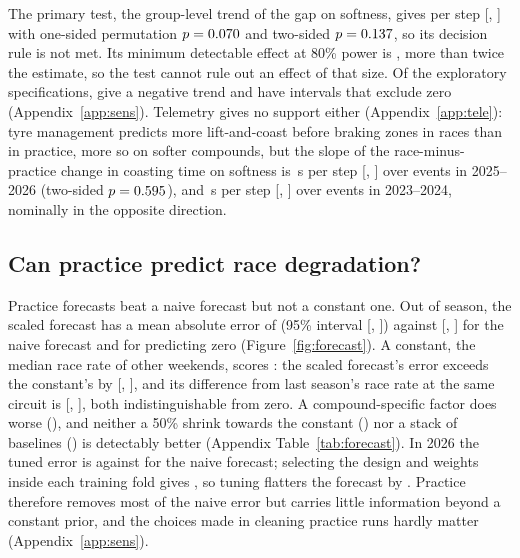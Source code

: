 The primary test, the group-level trend of the gap on softness, gives \NursingTrend\spl{} per step [\NursingTrendLo, \NursingTrendHi] with one-sided permutation $p=0.070$ and two-sided $p=0.137$, so its decision rule is not met.
Its minimum detectable effect at 80\% power is \NursingMDE\spl, more than twice the estimate, so the test cannot rule out an effect of that size.
Of the \MultiverseSpecs{} exploratory specifications, \MultiverseNegative{} give a negative trend and \MultiverseExcludesZero{} have intervals that exclude zero (Appendix~\ref{app:sens}).
Telemetry gives no support either (Appendix~\ref{app:tele}): tyre management predicts more lift-and-coast before braking zones in races than in practice, more so on softer compounds, but the slope of the race-minus-practice change in coasting time on softness is \TelePrimarySlope\,s per step [\TelePrimarySlopeLo, \TelePrimarySlopeHi] over \TelePrimaryNEventsTrend{} events in 2025--2026 (two-sided $p=0.595$), and \TeleExtensionSlope\,s per step [\TeleExtensionSlopeLo, \TeleExtensionSlopeHi] over \TeleExtensionNEventsTrend{} events in 2023--2024, nominally in the opposite direction.

\subsection{Can practice predict race degradation?}\label{sec:transfer}

Practice forecasts beat a naive forecast but not a constant one.
Out of season, the scaled forecast has a mean absolute error of \MaeScalar\spl{} (95\% interval [\MaeScalarLo, \MaeScalarHi]) against \MaeNaive\spl{} [\MaeNaiveLo, \MaeNaiveHi] for the naive forecast and \MaeZero\spl{} for predicting zero (Figure~\ref{fig:forecast}).
A constant, the median race rate of other weekends, scores \MaeConstant\spl: the scaled forecast's error exceeds the constant's by \DiffScalarVsConstant\spl{} [\DiffScalarVsConstantLo, \DiffScalarVsConstantHi], and its difference from last season's race rate at the same circuit is \DiffScalarVsHistory\spl{} [\DiffScalarVsHistoryLo, \DiffScalarVsHistoryHi], both indistinguishable from zero.
A compound-specific factor does worse (\MaeCompound\spl), and neither a 50\% shrink towards the constant (\MaeShrink\spl) nor a stack of baselines (\MaeStack\spl) is detectably better (Appendix Table~\ref{tab:forecast}).
In 2026 the tuned error is \MaeTwentySixScalar\spl{} against \MaeTwentySixNaive\spl{} for the naive forecast; selecting the design and weights inside each training fold gives \MaeNested\spl, so tuning flatters the forecast by \NestedOptimism\spl.
Practice therefore removes most of the naive error but carries little information beyond a constant prior, and the choices made in cleaning practice runs hardly matter (Appendix~\ref{app:sens}).


